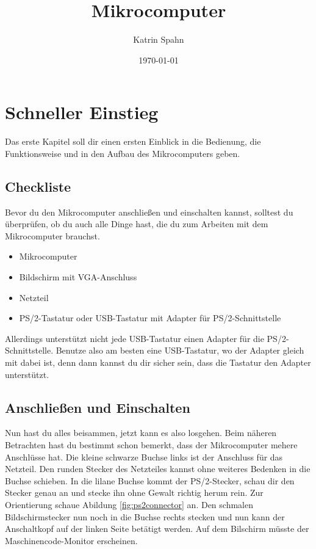 \documentclass[10pt]{book}
\title{Mikrocomputer}
\author{Katrin Spahn}
\date{\today}
\begin{document}
\maketitle

\chapter{Schneller Einstieg}

Das erste Kapitel soll dir einen ersten Einblick
in die Bedienung, die Funktionsweise
und in den Aufbau des Mikrocomputers geben.

\section{Checkliste}
Bevor du den Mikrocomputer anschließen und einschalten
kannst, solltest du überprüfen, ob du auch alle Dinge
hast, die du zum Arbeiten mit dem Mikrocomputer brauchst.

\begin{itemize}
\item Mikrocomputer
\item Bildschirm mit VGA-Anschluss
\item Netzteil
\item PS/2-Tastatur oder USB-Tastatur
mit Adapter für PS/2-Schnitt\-stelle
\end{itemize}

Allerdings unterstützt nicht jede USB-Tastatur
einen Adapter für die PS/2-Schnittstelle.
Benutze also am besten eine USB-Tastatur,
wo der Adapter gleich mit dabei ist,
denn dann kannst du dir sicher sein,
dass die Tastatur den Adapter unterstützt.

\section{Anschließen und Einschalten}
Nun hast du alles beisammen, jetzt kann es also losgehen.
Beim näheren Betrachten hast du bestimmt schon bemerkt,
dass der Mikrocomputer mehere Anschlüsse hat.
Die kleine schwarze Buchse links
ist der Anschluss für das Netzteil.
Den runden Stecker des Netzteiles kannst
ohne weiteres Bedenken in die Buchse schieben.
In die lilane Buchse kommt der PS/2-Stecker,
schau dir den Stecker genau an und stecke ihn
ohne Gewalt richtig herum rein.
Zur Orientierung schaue
Abildung \ref{fig:ps2connector} an.
Den schmalen Bildschirmstecker nun noch
in die Buchse rechts stecken
und nun kann der Anschaltkopf
auf der linken Seite betätigt werden.
Auf dem Bilschirm müsste der
Maschinencode-Monitor erscheinen.
\end{document}

